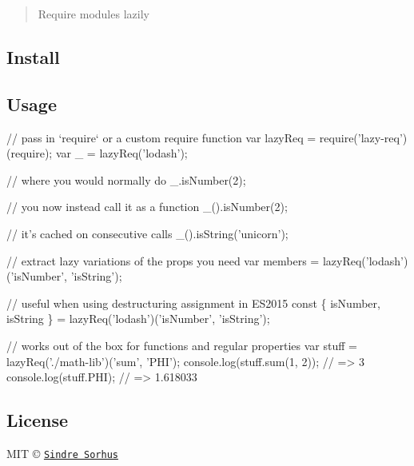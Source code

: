 \begin{quote}
Require modules lazily \end{quote}


\subsection*{Install}




\subsection*{Usage}


\begin{DoxyCode}
// pass in `require` or a custom require function
var lazyReq = require('lazy-req')(require);
var \_ = lazyReq('lodash');

// where you would normally do
\_.isNumber(2);

// you now instead call it as a function
\_().isNumber(2);

// it's cached on consecutive calls
\_().isString('unicorn');

// extract lazy variations of the props you need
var members = lazyReq('lodash')('isNumber', 'isString');

// useful when using destructuring assignment in ES2015
const \{ isNumber, isString \} = lazyReq('lodash')('isNumber', 'isString');

// works out of the box for functions and regular properties
var stuff = lazyReq('./math-lib')('sum', 'PHI');
console.log(stuff.sum(1, 2)); // => 3
console.log(stuff.PHI); // => 1.618033
\end{DoxyCode}


\subsection*{License}

M\+IT © \href{http://sindresorhus.com}{\tt Sindre Sorhus} 